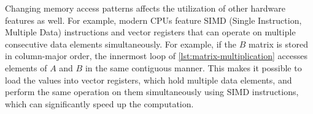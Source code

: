 

Changing memory access patterns affects the utilization of other hardware features as well. For example, modern CPUs feature SIMD (Single Instruction, Multiple Data) instructions and vector registers that can operate on multiple consecutive data elements simultaneously.
For example, if the $B$ matrix is stored in column-major order, the innermost loop of \cref{lst:matrix-multiplication} accesses elements of $A$ and $B$ in the same contiguous manner. This makes it possible to load the values into vector registers, which hold multiple data elements, and perform the same operation on them simultaneously using SIMD instructions, which can significantly speed up the computation.



